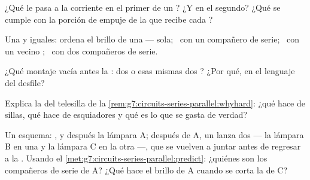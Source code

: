 \begin{exercise}[$\star$]\label{exo:g7:circuits-series-parallel:5}
¿Qué le pasa a la corriente en el primer  de un
? ¿Y en el segundo? ¿Qué se cumple con la
porción de empuje de la  que recibe cada ?
\end{exercise}

\begin{exercise}[$\star$]\label{exo:g7:circuits-series-parallel:6}
Una  y  iguales: ordena el brillo de una
 --- sola; \ con un compañero de serie; \ con un vecino ; \ con dos compañeros de serie.
\end{exercise}

\begin{exercise}[$\star$]\label{exo:g7:circuits-series-parallel:7}
¿Qué montaje vacía antes la : dos  
o esas mismas dos ? ¿Por qué, en el lenguaje del
desfile?
\end{exercise}

\begin{exercise}[$\star$]\label{exo:g7:circuits-series-parallel:8}
Explica la  del telesilla de la
\cref{rem:g7:circuits-series-parallel:whyhard}: ¿qué hace de sillas,
qué hace de esquiadores y qué es lo que se gasta de verdad?
\end{exercise}

\begin{exercise}[$\star\star$]\label{exo:g7:circuits-series-parallel:9}
Un esquema: ,  y después la lámpara A;
después de A, un  lanza dos  --- la lámpara B en
una y la lámpara C en la otra ---, que se vuelven a juntar antes de
regresar a la . Usando el
\cref{met:g7:circuits-series-parallel:predict}: ¿quiénes son los
compañeros de serie de A? ¿Qué hace el brillo de A cuando se corta la
 de C?
\end{exercise}

